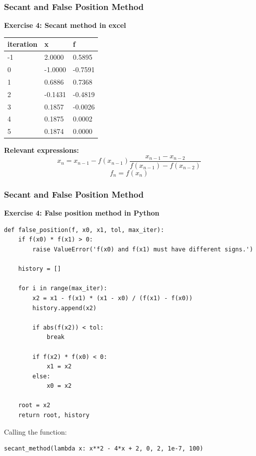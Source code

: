 \begin{frame}[fragile]
  \frametitle{Secant and False Position Method}

  \textbf{Exercise 4: Secant method in excel}

  \begin{table}[]
    \begin{tabular}{|l|l|l|}
      \hline
      iteration & x       & f       \\ \hline
      -1        & 2.0000  & 0.5895  \\ \hline
      0         & -1.0000 & -0.7591 \\ \hline
      1         & 0.6886  & 0.7368  \\ \hline
      2         & -0.1431 & -0.4819 \\ \hline
      3         & 0.1857  & -0.0026 \\ \hline
      4         & 0.1875  & 0.0002  \\ \hline
      5         & 0.1874  & 0.0000  \\ \hline
    \end{tabular}
  \end{table}
  \textbf{Relevant expressions:}
  \[
    x_{n} = x_{n-1} - f(x_{n-1})\frac{x_{n-1} - x_{n-2}}{f(x_{n-1}) - f(x_{n-2})}
  \]
  \[
    f_{n} = f(x_{n})
  \]
\end{frame}

\begin{frame}[fragile]
  \frametitle{Secant and False Position Method}

  \textbf{Exercise 4: False position method in Python}
  \begin{lstlisting}
def false_position(f, x0, x1, tol, max_iter):
    if f(x0) * f(x1) > 0:
        raise ValueError('f(x0) and f(x1) must have different signs.')

    history = []

    for i in range(max_iter):
        x2 = x1 - f(x1) * (x1 - x0) / (f(x1) - f(x0))
        history.append(x2)

        if abs(f(x2)) < tol:
            break

        if f(x2) * f(x0) < 0:
            x1 = x2
        else:
            x0 = x2

    root = x2
    return root, history
  \end{lstlisting}

  Calling the function:
  \begin{lstlisting}
secant_method(lambda x: x**2 - 4*x + 2, 0, 2, 1e-7, 100)
  \end{lstlisting}
\end{frame}

